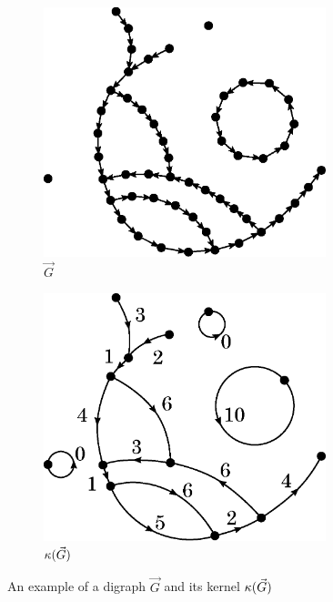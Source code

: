 \begin{figure}[htbp]
    \centering
    \begin{subfigure}[htbp]{0.45\textwidth}
        \centering
        \includegraphics[width=0.90\textwidth]{Content/Pictures/kernel1.eps}
        \caption{$\vec{G}$}
    \end{subfigure}
    \hfill
    \begin{subfigure}[htbp]{0.45\textwidth}
        \centering
        \includegraphics[width=0.90\textwidth]{Content/Pictures/kernel2.eps}
        \caption{$\kappa(\vec{G})$}
    \end{subfigure}
    \caption{An example of a digraph $\vec{G}$ and its kernel $\kappa(\vec{G})$}
    \label{fig:kernel}
\end{figure}

